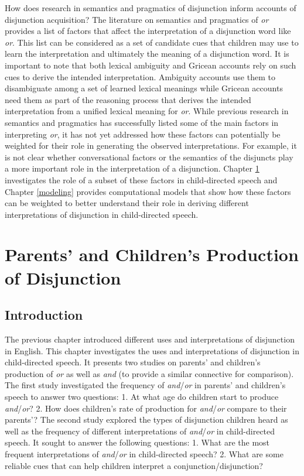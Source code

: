 \documentclass[oneside]{report}
\theoremstyle{definition}
\theoremstyle{definition}
\theoremstyle{definition}
\theoremstyle{remark}
\begin{document}
How does research in semantics and pragmatics of disjunction inform
accounts of disjunction acquisition? The literature on semantics and
pragmatics of \emph{or} provides a list of factors that affect the
interpretation of a disjunction word like \emph{or}. This list can be
considered as a set of candidate cues that children may use to learn the
interpretation and ultimately the meaning of a disjunction word. It is
important to note that both lexical ambiguity and Gricean accounts rely
on such cues to derive the intended interpretation. Ambiguity accounts
use them to disambiguate among a set of learned lexical meanings while
Gricean accounts need them as part of the reasoning process that derives
the intended interpretation from a unified lexical meaning for
\emph{or}. While previous research in semantics and pragmatics has
successfully listed some of the main factors in interpreting \emph{or},
it has not yet addressed how these factors can potentially be weighted
for their role in generating the observed interpretations. For example,
it is not clear whether conversational factors or the semantics of the
disjuncts play a more important role in the interpretation of a
disjunction. Chapter \ref{corpus} investigates the role of a subset of
these factors in child-directed speech and Chapter \ref{modeling}
provides computational models that show how these factors can be
weighted to better understand their role in deriving different
interpretations of disjunction in child-directed speech.

\chapter{Parents' and Children's Production of
Disjunction}\label{corpus}

\section{Introduction}\label{introduction-2}

The previous chapter introduced different uses and interpretations of
disjunction in English. This chapter investigates the uses and
interpretations of disjunction in child-directed speech. It presents two
studies on parents' and children's production of \emph{or} as well as
\emph{and} (to provide a similar connective for comparison). The first
study investigated the frequency of \emph{and}/\emph{or} in parents' and
children's speech to answer two questions: 1. At what age do children
start to produce \emph{and}/\emph{or}? 2. How does children's rate of
production for \emph{and}/\emph{or} compare to their parents'? The
second study explored the types of disjunction children heard as well as
the frequency of different interpretations of \emph{and}/\emph{or} in
child-directed speech. It sought to answer the following questions: 1.
What are the most frequent interpretations of \emph{and}/\emph{or} in
child-directed speech? 2. What are some reliable cues that can help
children interpret a conjunction/disjunction?
\end{document}
